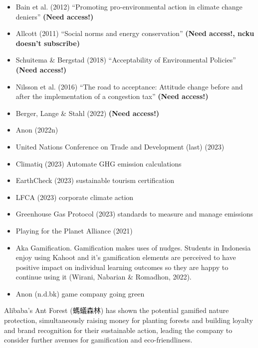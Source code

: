 \documentclass[
  letterpaper,
  DIV=11,
  numbers=noendperiod]{scrartcl}
\begin{document}
\begin{itemize}
\item
  Bain et al. (2012) ``Promoting pro-environmental action in climate
  change deniers'' \textbf{(Need access!)}
\item
  Allcott (2011) ``Social norms and energy conservation'' \textbf{(Need
  access!, ncku doesn't subscribe)}
\item
  Schuitema \& Bergstad (2018) ``Acceptability of Environmental
  Policies'' \textbf{(Need access!)}
\item
  Nilsson et al. (2016) ``The road to acceptance: Attitude change before
  and after the implementation of a congestion tax'' \textbf{(Need
  access!)}
\item
  Berger, Lange \& Stahl (2022) \textbf{(Need access!)}
\item
  Anon (2022n)
\item
  United Nations Conference on Trade and Development (last) (2023)
\item
  Climatiq (2023) Automate GHG emission calculations
\item
  EarthCheck (2023) sustainable tourism certification
\item
  LFCA (2023) corporate climate action
\item
  Greenhouse Gas Protocol (2023) standards to measure and manage
  emissions
\item
  Playing for the Planet Alliance (2021)
\item
  Aka Gamification. Gamification makes uses of nudges. Students in
  Indonesia enjoy using Kahoot and it's gamification elements are
  perceived to have positive impact on individual learning outcomes so
  they are happy to continue using it (Wirani, Nabarian \& Romadhon,
  2022).
\item
  Anon (n.d.bk) game company going green
\end{itemize}

Alibaba's Ant Forest (螞蟻森林) has shown the potential gamified nature
protection, simultaneously raising money for planting forests and
building loyalty and brand recognition for their sustainable action,
leading the company to consider further avenues for gamification and
eco-friendliness.
\end{document}

